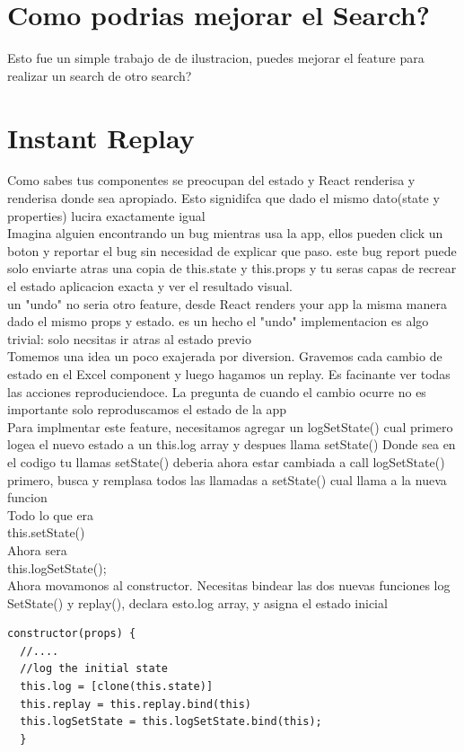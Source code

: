 \section{Como podrias mejorar el Search?}
Esto fue un simple trabajo de de ilustracion, puedes mejorar el feature para realizar un search de otro search?
\section{Instant Replay}
Como sabes tus componentes se preocupan del estado y React renderisa y renderisa donde sea apropiado. Esto signidifca que dado el mismo dato(state y properties) lucira exactamente igual\\
Imagina alguien encontrando un bug mientras usa la app, ellos pueden click un boton y reportar el bug sin necesidad de explicar que paso. este bug report puede solo enviarte atras una copia de this.state y this.props y tu seras capas de recrear el estado aplicacion exacta y ver el resultado visual.\\
un "undo" no seria otro feature, desde React renders your app la misma manera dado el mismo props y estado. es un hecho el "undo" implementacion es algo trivial: solo necsitas ir atras al estado previo\\
Tomemos una idea un poco exajerada por diversion. Gravemos cada cambio de estado en el Excel component y luego hagamos un replay. Es facinante ver todas las acciones reproduciendoce. La pregunta de cuando el cambio ocurre no es importante solo reproduscamos el estado de la app\\
Para implmentar este feature, necesitamos agregar un logSetState() cual primero logea el nuevo estado a un this.log array y despues llama setState() Donde sea en el codigo tu llamas setState() deberia ahora estar cambiada a call logSetState() primero, busca y remplasa todos las llamadas a setState() cual llama a la nueva funcion
\\
Todo lo que era
\\
this.setState()
\\
Ahora sera
\\
this.logSetState();
\\
Ahora movamonos al constructor. Necesitas bindear las dos nuevas funciones log SetState() y replay(), declara esto.log array, y asigna el estado inicial\\
\begin{lstlisting}[language=html]
constructor(props) {
  //....
  //log the initial state
  this.log = [clone(this.state)]
  this.replay = this.replay.bind(this)
  this.logSetState = this.logSetState.bind(this);
  }
\end{lstlisting}

